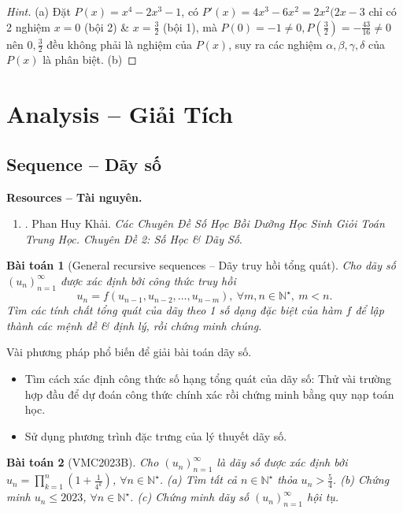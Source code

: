 \documentclass{article}
\newtheorem{baitoan}{Bài toán}
\begin{document}
\begin{proof}[Hint]
	(a) Đặt $P(x) = x^4 - 2x^3 - 1$, có $P'(x) = 4x^3 - 6x^2 = 2x^2(2x - 3$ chỉ có 2 nghiệm $x = 0$ (bội 2) \& $x = \frac{3}{2}$ (bội 1), mà $P(0) = -1\ne0,P(\frac{3}{2}) = -\frac{43}{16}\ne0$ nên $0,\frac{3}{2}$ đều không phải là nghiệm của $P(x)$, suy ra các nghiệm $\alpha,\beta,\gamma,\delta$ của $P(x)$ là phân biệt. (b) 
\end{proof}


\section{Analysis -- Giải Tích}

\subsection{Sequence -- Dãy số}
\textbf{\textsf{Resources -- Tài nguyên.}}
\begin{enumerate}
	\item \cite{Khai_so_hoc_day_so}. {\sc Phan Huy Khải}. {\it Các Chuyên Đề Số Học Bồi Dưỡng Học Sinh Giỏi Toán Trung Học. Chuyên Đề 2: Số Học \& Dãy Số}.
\end{enumerate}

\begin{baitoan}[General recursive sequences -- Dãy truy hồi tổng quát]
	Cho dãy số $(u_n)_{n=1}^\infty$ được xác định bởi công thức truy hồi
	\begin{equation}
		\boxed{u_n = f(u_{n-1},u_{n-2},\ldots,u_{n-m}),\ \forall m,n\in\mathbb{N}^\star,\ m < n.}
	\end{equation}
	Tìm các tính chất tổng quát của dãy theo 1 số dạng đặc biệt của hàm $f$ để lập thành các mệnh đề \& định lý, rồi chứng minh chúng.
\end{baitoan}
{\sf Vài phương pháp phổ biến để giải bài toán dãy số.}
\begin{itemize}
	\item Tìm cách xác định công thức số hạng tổng quát của dãy số: Thử vài trường hợp đầu để dự đoán công thức chính xác rồi chứng minh bằng quy nạp toán học.
	\item Sử dụng phương trình đặc trưng của lý thuyết dãy số.
\end{itemize}

\begin{baitoan}[VMC2023B]
	Cho $(u_n)_{n=1}^\infty$ là dãy số được xác định bởi $u_n = \prod_{k=1}^n \left(1 + \frac{1}{4^k}\right)$, $\forall n\in\mathbb{N}^\star$. (a) Tìm tất cả $n\in\mathbb{N}^\star$ thỏa $u_n > \frac{5}{4}$. (b) Chứng minh $u_n\le2023$, $\forall n\in\mathbb{N}^\star$. (c) Chứng minh dãy số $(u_n)_{n=1}^\infty$ hội tụ.
\end{baitoan}
\end{document}
